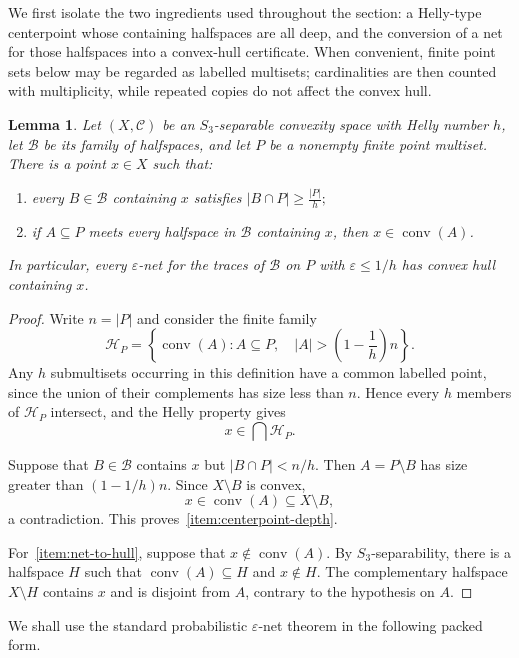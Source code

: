 \documentclass[11pt]{article}
\newtheorem{lem}[thm]{Lemma}
\theoremstyle{definition}
\newcommand{\C}{\mathcal{C}}
\newcommand{\B}{\mathcal{B}}
\newcommand{\conv}{\operatorname{conv}}
\begin{document}
We first isolate the two ingredients used throughout the section: a
Helly-type centerpoint whose containing halfspaces are all deep, and
the conversion of a net for those halfspaces into a convex-hull
certificate.  When convenient, finite point sets below may be regarded
as labelled multisets; cardinalities are then counted with
multiplicity, while repeated copies do not affect the convex hull.

\begin{lem}
\label{lem:helly-centerpoint}
Let $(X,\C)$ be an $S_3$-separable convexity space with Helly number
$h$, let $\B$ be its family of halfspaces, and let $P$ be a nonempty
finite point multiset.  There is a point $x\in X$ such that:
\begin{enumerate}
    \item\label{item:centerpoint-depth}
    every $B\in\B$ containing $x$ satisfies
    $|B\cap P|\ge \frac{|P|}{h};$
    \item\label{item:net-to-hull}
    if $A\subseteq P$ meets every halfspace in $\B$ containing $x$,
    then $x\in\conv(A)$.
\end{enumerate}
In particular, every $\varepsilon$-net for the traces of $\B$ on $P$
with $\varepsilon\le 1/h$ has convex hull containing $x$.
\end{lem}

\begin{proof}
Write $n=|P|$ and consider the finite family
\[
\mathcal H_P=
\left\{
\conv(A):
A\subseteq P,\quad
|A|>\left(1-\frac1h\right)n
\right\}.
\]
Any $h$ submultisets occurring in this definition have a common
labelled point, since the union of their complements has size less
than $n$.  Hence every $h$ members of $\mathcal H_P$ intersect, and
the Helly property gives
\[
x\in\bigcap\mathcal H_P.
\]

Suppose that $B\in\B$ contains $x$ but $|B\cap P|<n/h$.  Then
$A=P\setminus B$ has size greater than $(1-1/h)n$.  Since
$X\setminus B$ is convex,
\[
x\in\conv(A)\subseteq X\setminus B,
\]
a contradiction.  This proves~\ref{item:centerpoint-depth}.

For~\ref{item:net-to-hull}, suppose that $x\notin\conv(A)$.
By $S_3$-separability, there is a halfspace $H$ such that
$\conv(A)\subseteq H$
and 
$x\notin H.$
The complementary halfspace $X\setminus H$ contains $x$ and is
disjoint from $A$, contrary to the hypothesis on $A$.
\end{proof}

We shall use the standard probabilistic $\varepsilon$-net theorem in
the following packed form.
\end{document}
